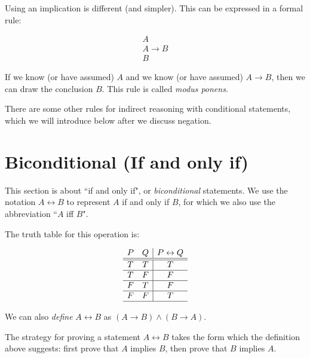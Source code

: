 \documentclass[12pt]{article}
\begin{document}
Using an implication is different (and simpler).  This can be expressed in a formal rule:


$$\begin{array}{c}

A \\

A \rightarrow B \\ \hline

B

\end{array}$$




If we know (or have assumed) $A$ and we know (or have assumed) $A \rightarrow B$, then we can draw the conclusion $B$.  This rule is called {\em modus ponens\/}.

There are some other rules for indirect reasoning with conditional statements, which we will introduce below after we discuss negation.

\newpage

\section{Biconditional (If and only if)}

This section is about ``if and only if", or {\em biconditional\/} statements.  We use the notation $A \leftrightarrow B$ to represent $A$ if and only if $B$, for which we also use the abbreviation ``$A$ iff $B$".

The truth table for this operation is:

$$\begin{array}{cc|c}

P & Q & P \leftrightarrow Q \\ \hline \hline

T & T & T \\ \hline
T & F & F \\ \hline
F & T & F \\ \hline
F & F & T \\ \hline

\end{array}$$

We can also {\em define\/} $A \leftrightarrow B$ as $(A \rightarrow B) \wedge (B \rightarrow A)$.

The strategy for proving a statement $A \leftrightarrow B$ takes the form which the definition above suggests:  first prove that $A$ implies $B$, then prove that $B$ implies $A$.
\end{document}
